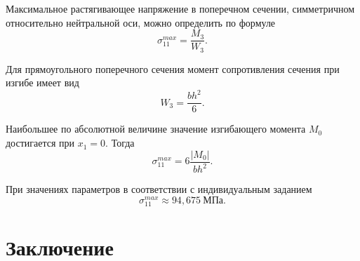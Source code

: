 \documentclass[12pt, a4paper]{article}
\begin{document}
	Максимальное растягивающее напряжение в поперечном сечении, симметричном относительно нейтральной оси, можно определить по формуле
	\[
	\sigma_{11}^{max} = \frac{M_3}{W_3}.
	\]
	
	Для прямоугольного поперечного сечения момент сопротивления сечения при изгибе имеет вид
	\[
	W_3 = \frac{b h^2}{6}.
	\]
	
	Наибольшее по абсолютной величине значение изгибающего момента $M_0$ достигается при $x_1 = 0$. Тогда 
	\[
	\sigma_{11}^{max} = 6 \frac{|M_0|}{b h^2}.
	\]
	
	При значениях параметров в соответствии с индивидуальным заданием
	\[
	\sigma_{11}^{max} \approx 94{,}675 \ \text{МПа}.
	\]
	
	\newpage
	\section{Заключение}
	
\end{document}
